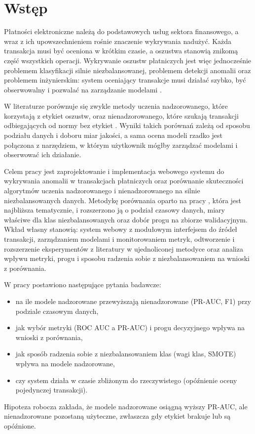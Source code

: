 \chapter*{Wstęp}

Płatności elektroniczne należą do podstawowych usług sektora finansowego, a wraz z ich upowszechnieniem rośnie znaczenie wykrywania nadużyć. Każda transakcja musi być oceniona w krótkim czasie, a oszustwa stanowią znikomą część wszystkich operacji. Wykrywanie oszustw płatniczych jest więc jednocześnie problemem klasyfikacji silnie niezbalansowanej, problemem detekcji anomalii oraz problemem inżynierskim: system oceniający transakcje musi działać szybko, być obserwowalny i pozwalać na zarządzanie modelami \cite{dalpozzolo2018}. 

W literaturze porównuje się zwykle metody uczenia nadzorowanego, które korzystają z etykiet oszustw, oraz nienadzorowanego, które szukają transakcji odbiegających od normy bez etykiet \cite{niu2019,carcillo2019}. Wyniki takich porównań zależą od sposobu podziału danych i doboru miar jakości, a sama ocena modeli rzadko jest połączona z narzędziem, w którym użytkownik mógłby zarządzać modelami i obserwować ich działanie.

Celem pracy jest zaprojektowanie i implementacja webowego systemu do wykrywania anomalii w transakcjach płatniczych oraz porównanie skuteczności algorytmów uczenia nadzorowanego i nienadzorowanego na silnie niezbalansowanych danych. Metodykę porównania oparto na pracy \cite{niu2019}, która jest najbliższa tematycznie, i rozszerzono ją o podział czasowy danych, miary właściwe dla klas niezbalansowanych oraz dobór progu na zbiorze walidacyjnym. Wkład własny stanowią: system webowy z modułowym interfejsem do źródeł transakcji, zarządzaniem modelami i monitorowaniem metryk, odtworzenie i rozszerzenie eksperymentów z literatury w ujednoliconej metodyce oraz analiza wpływu metryki, progu i sposobu radzenia sobie z niezbalansowaniem na wnioski z porównania. 

W pracy postawiono następujące pytania badawcze:
\begin{itemize}
  \item na ile modele nadzorowane przewyższają nienadzorowane (PR-AUC, F1) przy podziale czasowym danych,
  \item jak wybór metryki (ROC AUC a PR-AUC) i progu decyzyjnego wpływa na wnioski z porównania,
  \item jak sposób radzenia sobie z niezbalansowaniem klas (wagi klas, SMOTE) wpływa na modele nadzorowane,
  \item czy system działa w czasie zbliżonym do rzeczywistego (opóźnienie oceny pojedynczej transakcji).
\end{itemize}
Hipoteza robocza zakłada, że modele nadzorowane osiągną wyższy PR-AUC, ale nienadzorowane pozostaną użyteczne, zwłaszcza gdy etykiet brakuje lub są opóźnione.

